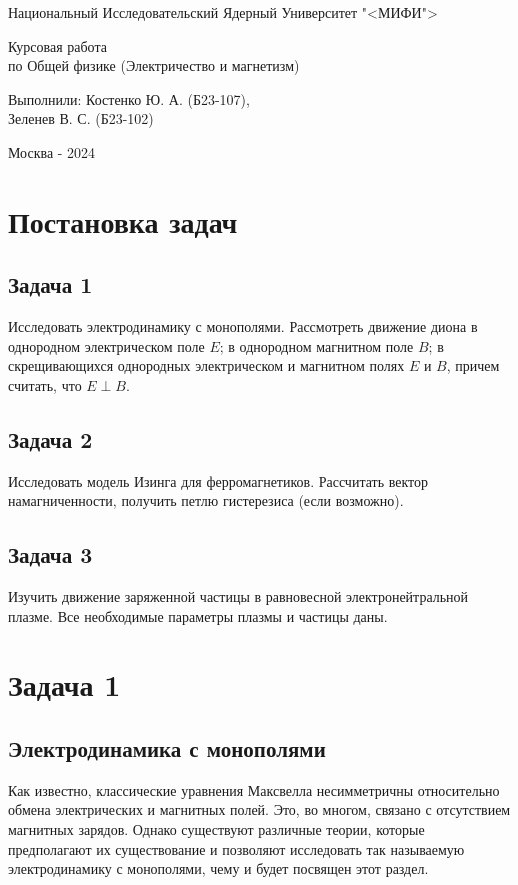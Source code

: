 \documentclass[oneside,final,14pt]{extarticle}
\begin{document}
	\begin{titlepage}
		\centerline{Национальный Исследовательский Ядерный Университет "<МИФИ">}
		\vfill
		\Large
		\begin{center}
			Курсовая работа\\ по Общей физике (Электричество и магнетизм)
		\end{center}
		\normalsize
		\vfill
		\begin{flushright}
			Выполнили: Костенко Ю. А. (Б23-107), \\ Зеленев В. С. (Б23-102)
		\end{flushright}
		\vfill \vfill \vfill
		\centerline{Москва - 2024}
	\end{titlepage}
	\setcounter{page}{2}
	\tableofcontents
	\newpage
	
	\section{Постановка задач}
	\subsection{Задача 1}
	Исследовать электродинамику с монополями. Рассмотреть движение диона в однородном электрическом поле $E$; в однородном магнитном поле $B$; в скрещивающихся однородных электрическом и магнитном полях $E$ и $B$, причем считать, что $E \perp B$.
	\subsection{Задача 2}
	Исследовать модель Изинга для ферромагнетиков. Рассчитать вектор намагниченности, получить петлю гистерезиса (если возможно). 
	\subsection{Задача 3}
	Изучить движение заряженной частицы в равновесной электронейтральной плазме. Все необходимые параметры плазмы и частицы даны. 
	\newpage
	
	\section{Задача 1}
	\subsection{Электродинамика с монополями}
	
	\noindent Как известно, классические уравнения Максвелла несимметричны относительно обмена электрических и магнитных полей. Это, во многом, связано с отсутствием магнитных зарядов. Однако существуют различные теории, которые предполагают их существование и позволяют исследовать так называемую электродинамику с монополями, чему и будет посвящен этот раздел. \\ 
	
\end{document}
